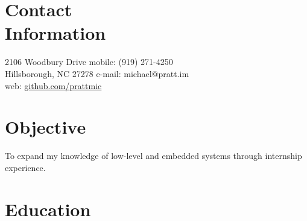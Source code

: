 \documentclass[margin,line,letterpaper]{resume}
\begin{document}
\begin{resume}

    \section{\mysidestyle Contact\\Information}

    2106 Woodbury Drive             \hfill mobile: (919) 271-4250          \vspace{0mm}\\\vspace{0mm}%
    Hillsborough, NC 27278          \hfill e-mail: michael@pratt.im      \vspace{0mm}\\\vspace{0mm}%
                                    \hfill web: \href{http://github.com/prattmic}{github.com/prattmic}      \vspace{0mm}\\\vspace{-4.5mm}%


    \section{\mysidestyle Objective}


    To expand my knowledge of low-level and embedded systems through internship experience.


    \section{\mysidestyle Education}


\end{resume}
\end{document}
